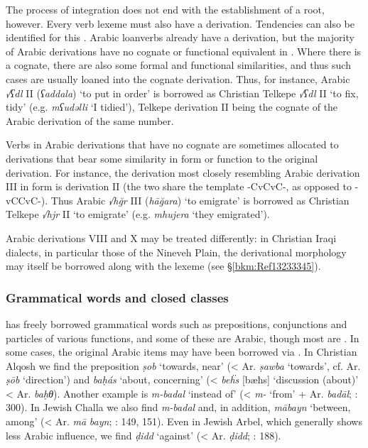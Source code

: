 \documentclass[output=paper]{langsci/langscibook}
\begin{document}
The process of integration does not end with the establishment of a {root}, however. Every verb lexeme must also have a {derivation}. Tendencies can also be identified for this \citep{Coghill2015}. Arabic loanverbs already have a {derivation}, but the majority of Arabic derivations have no {cognate} or functional equivalent in . Where there is a {cognate}, there are also some formal and functional similarities, and thus such cases are usually loaned into the {cognate} {derivation}. Thus, for instance, Arabic \textit{√ʕdl} II (\textit{ʕaddala}) ‘to put in order’ is borrowed as Christian Telkepe \textit{√ʕdl} II ‘to fix, tidy’ (e.g. \textit{mʕudəlli} ‘I tidied’), Telkepe {derivation} II being the {cognate} of the Arabic {derivation} of the same number.

Verbs in Arabic derivations that have no {cognate} are sometimes allocated to derivations that bear some similarity in form or function to the original {derivation}. For instance, the  {derivation} most closely resembling Arabic {derivation} III in form is {derivation} II (the two share the template -CvCvC-, as opposed to -vCCvC-). Thus Arabic \textit{√hğr} III (\textit{hāğara}) ‘to emigrate’ is borrowed as Christian Telkepe \textit{√hjr} II ‘to emigrate’ (e.g. \textit{mhujera} ‘they emigrated’).

Arabic derivations VIII and X may be treated differently: in Christian Iraqi dialects, in particular those of the Nineveh Plain, the {derivational} morphology may itself be borrowed along with the lexeme (see §\ref{bkm:Ref13233345}).

\subsubsection{Grammatical words and closed classes}\label{closedclass}

 has freely borrowed grammatical words such as {prepositions}, conjunctions and particles of various functions, and some of these are Arabic, though most are . In some cases, the original Arabic items may have been borrowed via . In Christian Alqosh we find the {preposition} \textit{ṣob} ‘towards, near’ (< Ar. \textit{ṣawba} ‘towards’, cf.  Ar. \textit{ṣōb} ‘direction’) and \textit{baḥás} ‘about, concerning’ (<  \textit{be\"{h}s} [bæħs] ‘discussion (about)’ < Ar. \textit{baḥθ}). Another example is \textit{m-badal} ‘instead of’ (< \textit{m-} ‘from’ +  Ar. \textit{badāl}; \citealt{Coghill2004}: 300). In Jewish Challa we also find \textit{m-badal} and, in addition, \textit{mābayn} ‘between, among’ (< Ar. \textit{mā} \textit{bayn}; \citealt{Fassberg2010}: 149, 151). Even in Jewish Arbel, which generally shows less Arabic influence, we find \textit{ḍidd} ‘against’ (< Ar. \textit{ḍidd}; \citealt{Khan1999}: 188).
\end{document}
